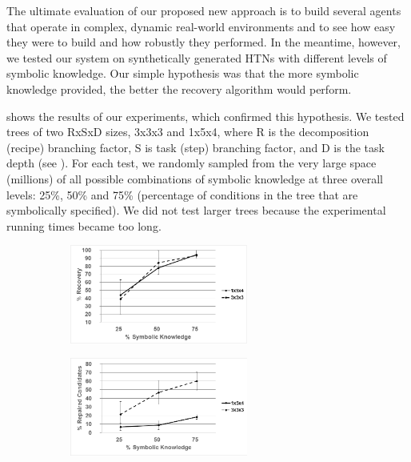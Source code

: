 \documentclass{llncs}
\begin{document}
The ultimate evaluation of our proposed new approach is to
build several agents that operate in complex, dynamic real-world
environments and to see how easy they were to build and how robustly
they performed.  In the meantime, however, we tested our system
on synthetically generated HTNs with different levels of symbolic
knowledge.  Our simple hypothesis was that the more symbolic knowledge
provided, the better the recovery algorithm would perform.

 shows the results of our experiments, which confirmed
this hypothesis.  We tested trees of two RxSxD sizes, 3x3x3 and 1x5x4,
where R is the decomposition (recipe) branching factor, S is task
(step) branching factor, and D is the task depth (see ).
For each test, we randomly sampled from the very large space (millions) of all
possible combinations of symbolic knowledge at three overall levels:
25\%, 50\% and 75\% (percentage of conditions in the tree that are
symbolically specified).  We did not test larger trees because the
experimental running times became too long.

\begin{figure}[t]
\centering
\begin{subfigure}{2.3in}
\centerline{\includegraphics[width=2.3in]{figs/recovery}}
\vskip 8pt 
\end{subfigure}
\hfill
\begin{subfigure}{2.3in}
\centerline{\includegraphics[width=2.3in]{figs/candidates}}
\vskip 8pt 
\end{subfigure}
\vskip 6pt
 \end{figure}
\end{document}
